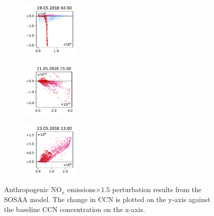 \begin{figure}[H]
    \begin{subfigure}
        \centering
        \includegraphics[width=0.30\textwidth,valign=t]{evaluation/figures/perturbations/perturbation-19.05.2018:04.00-nox-mul-1.5.pdf}
    \end{subfigure}
    \begin{subfigure}
        \centering
        \includegraphics[width=0.30\textwidth,valign=t]{evaluation/figures/perturbations/perturbation-21.05.2018:15.00-nox-mul-1.5.pdf}
    \end{subfigure}
    \begin{subfigure}
        \centering
        \includegraphics[width=0.30\textwidth,valign=t]{evaluation/figures/perturbations/perturbation-23.05.2018:13.00-nox-mul-1.5.pdf}
    \end{subfigure}

    \caption[$\text{NO}_x$ emissions$\times 1.5$ perturbation SOSAA results]{Anthropogenic $\text{NO}_x$ emissions$\times 1.5$ perturbation results from the SOSAA model. The change in CCN is plotted on the y-axis against the baseline CCN concentration on the x-axis.}
    \label{fig:sosaa-perturbation-nox-mul-1.5}
\end{figure}

